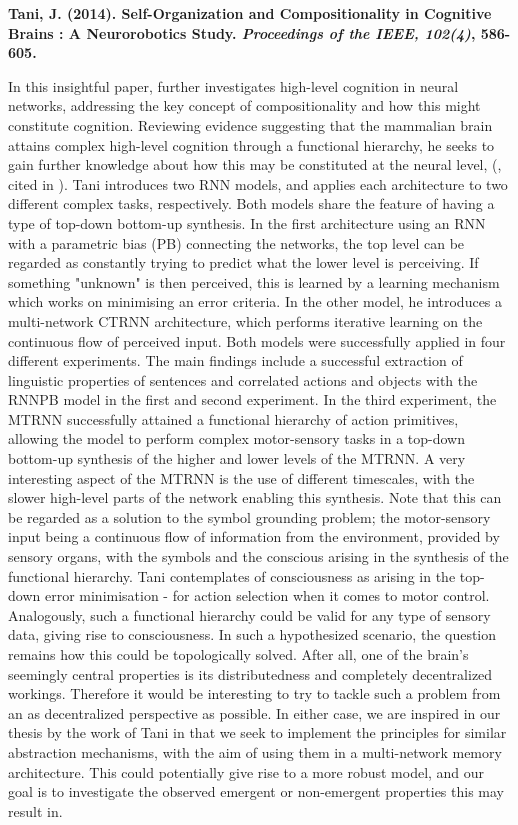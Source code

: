 \textbf{Tani, J. (2014). Self-Organization and Compositionality in Cognitive Brains : A Neurorobotics Study. \textit{Proceedings of the IEEE, 102(4)}, 586-605.}

In this insightful paper, \cite{Tani2014} further investigates high-level cognition in neural networks, addressing the key concept of compositionality and how this might constitute cognition. Reviewing evidence suggesting that the mammalian brain attains complex high-level cognition through a functional hierarchy, he seeks to gain further knowledge about how this may be constituted at the neural level, (\cite{Miyake2000, Koechlin2003, Fuster2008}, cited in \cite{Tani2014}). Tani introduces two RNN models, and applies each architecture to two different complex tasks, respectively. Both models share the feature of having a type of top-down bottom-up synthesis. In the first architecture using an RNN with a parametric bias (PB) connecting the networks, the top level can be regarded as constantly trying to predict what the lower level is perceiving. If something "unknown" is then perceived, this is learned by a learning mechanism which works on minimising an error criteria. In the other model, he introduces a multi-network CTRNN architecture, which performs iterative learning on the continuous flow of perceived input. Both models were successfully applied in four different experiments. The main findings include a successful extraction of linguistic properties of sentences and correlated actions and objects with the RNNPB model in the first and second experiment. In the third experiment, the MTRNN successfully attained a functional hierarchy of action primitives, allowing the model to perform complex motor-sensory tasks in a top-down bottom-up synthesis of the higher and lower levels of the MTRNN. A very interesting aspect of the MTRNN is the use of different timescales, with the slower high-level parts of the network enabling this synthesis. Note that this can be regarded as a solution to the symbol grounding problem; the motor-sensory input being a continuous flow of information from the environment, provided by sensory organs, with the symbols and the conscious arising in the synthesis of the functional hierarchy. Tani contemplates of consciousness as arising in the top-down error minimisation - for action selection when it comes to motor control. Analogously, such a functional hierarchy could be valid for any type of sensory data, giving rise to consciousness. In such a hypothesized scenario, the question remains how this could be topologically solved. After all, one of the brain's seemingly central properties is its distributedness and completely decentralized workings. Therefore it would be interesting to try to tackle such a problem from an as decentralized perspective as possible. In either case, we are inspired in our thesis by the work of Tani in that we seek to implement the principles for similar abstraction mechanisms, with the aim of using them in a multi-network memory architecture. This could potentially give rise to a more robust model, and our goal is to investigate the observed emergent or non-emergent properties this may result in.


